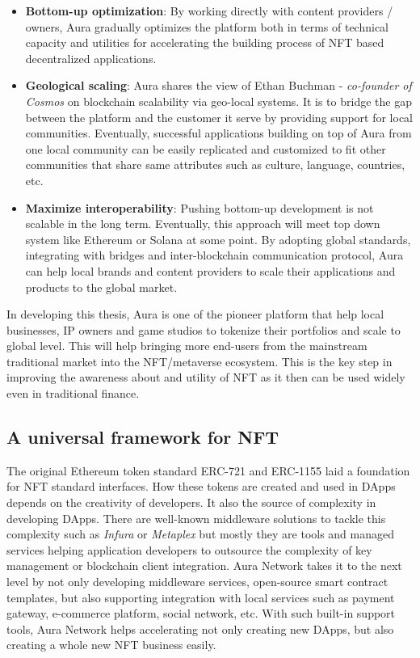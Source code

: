 \documentclass[11pt, titlepage]{article}
\begin{document}
\begin{itemize}
    \item \textbf{Bottom-up optimization}: By working directly with content providers / owners, Aura gradually optimizes the platform both in terms of technical capacity and utilities for accelerating the building process of NFT based decentralized applications. 
    \item \textbf{Geological scaling}: Aura shares the view of Ethan Buchman - \emph{co-founder of Cosmos} on blockchain scalability via geo-local systems. It is to bridge the gap between the platform and the customer it serve by providing support for local communities. Eventually, successful applications building on top of Aura from one local community can be easily replicated and customized to fit other communities that share same attributes such as culture, language, countries, etc.
    
    \item \textbf{Maximize interoperability}: Pushing bottom-up development is not scalable in the long term. Eventually, this approach will meet top down system like Ethereum or Solana at some point. By adopting global standards, integrating with bridges and inter-blockchain communication protocol, Aura can help local brands and content providers to scale their applications and products to the global market.
\end{itemize}

In developing this thesis, Aura is one of the pioneer platform that help local businesses, IP owners and game studios to tokenize their portfolios and scale to global level. This will help bringing more end-users from the mainstream traditional market into the NFT/metaverse ecosystem. This is the key step in improving the awareness about and utility of NFT as it then can be used widely even in traditional finance.  

\subsection{A universal framework for NFT}
The original Ethereum token standard ERC-721 and ERC-1155 laid a foundation for NFT standard interfaces. How these tokens are created and used in DApps depends on the creativity of developers. It also the source of complexity in developing DApps. There are well-known middleware solutions to tackle this complexity such as \emph{Infura} or \emph{Metaplex} but mostly they are tools and managed services helping application developers to outsource the complexity of key management or blockchain client integration. Aura Network takes it to the next level by not only developing middleware services, open-source smart contract templates, but also supporting integration with local services such as payment gateway, e-commerce platform, social network, etc. With such built-in support tools, Aura Network helps accelerating not only creating new DApps, but also creating a whole new NFT business easily. 
\end{document}
